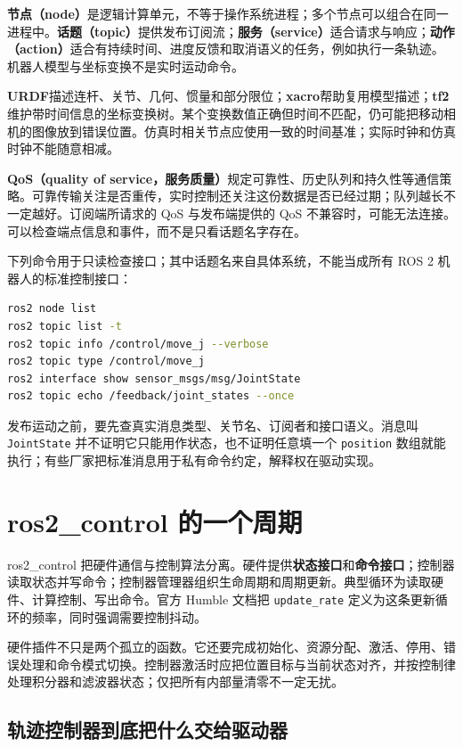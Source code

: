 \textbf{节点（node）}是逻辑计算单元，不等于操作系统进程；多个节点可以组合在同一进程中。\textbf{话题（topic）}提供发布订阅流；\textbf{服务（service）}适合请求与响应；\textbf{动作（action）}适合有持续时间、进度反馈和取消语义的任务，例如执行一条轨迹。机器人模型与坐标变换不是实时运动命令。

\textbf{URDF}描述连杆、关节、几何、惯量和部分限位；\textbf{xacro}帮助复用模型描述；\textbf{tf2}维护带时间信息的坐标变换树。某个变换数值正确但时间不匹配，仍可能把移动相机的图像放到错误位置。仿真时相关节点应使用一致的时间基准；实际时钟和仿真时钟不能随意相减。

\textbf{QoS（quality of service，服务质量）}规定可靠性、历史队列和持久性等通信策略。可靠传输关注是否重传，实时控制还关注这份数据是否已经过期；队列越长不一定越好。订阅端所请求的 QoS 与发布端提供的 QoS 不兼容时，可能无法连接。可以检查端点信息和事件，而不是只看话题名字存在。

下列命令用于只读检查接口；其中话题名来自具体系统，不能当成所有 ROS 2 机器人的标准控制接口：
\begin{lstlisting}[language=bash]
ros2 node list
ros2 topic list -t
ros2 topic info /control/move_j --verbose
ros2 topic type /control/move_j
ros2 interface show sensor_msgs/msg/JointState
ros2 topic echo /feedback/joint_states --once
\end{lstlisting}
发布运动之前，要先查真实消息类型、关节名、订阅者和接口语义。消息叫 \texttt{JointState} 并不证明它只能用作状态，也不证明任意填一个 \texttt{position} 数组就能执行；有些厂家把标准消息用于私有命令约定，解释权在驱动实现。

\section{ros2\_control 的一个周期}

ros2\_control 把硬件通信与控制算法分离。硬件提供\textbf{状态接口}和\textbf{命令接口}；控制器读取状态并写命令；控制器管理器组织生命周期和周期更新。典型循环为读取硬件、计算控制、写出命令。官方 Humble 文档把 \texttt{update\_rate} 定义为这条更新循环的频率，同时强调需要控制抖动。\cite{ros2control}

硬件插件不只是两个孤立的函数。它还要完成初始化、资源分配、激活、停用、错误处理和命令模式切换。控制器激活时应把位置目标与当前状态对齐，并按控制律处理积分器和滤波器状态；仅把所有内部量清零不一定无扰。

\subsection{轨迹控制器到底把什么交给驱动器}

